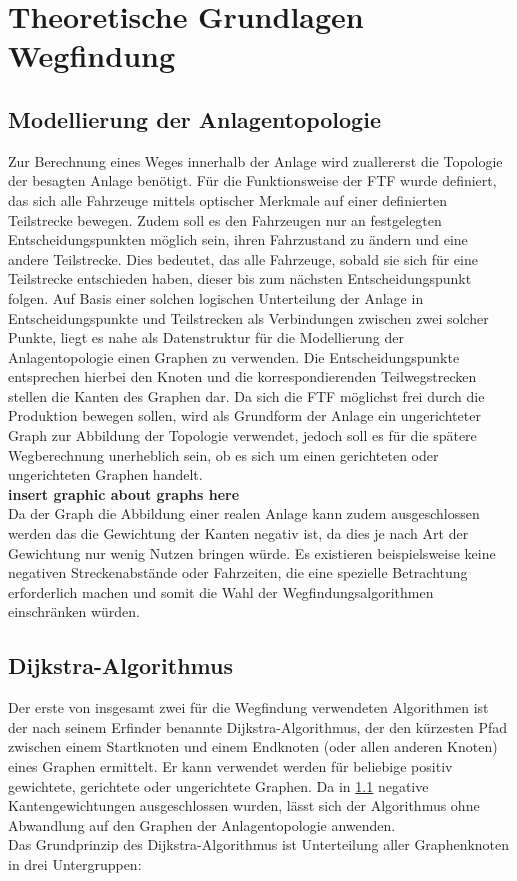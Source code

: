 \chapter{Theoretische Grundlagen Wegfindung}

\section{Modellierung der Anlagentopologie}
	\label{Graph_Anlage}
	Zur Berechnung eines Weges innerhalb der Anlage wird zuallererst die Topologie der besagten Anlage benötigt. Für die Funktionsweise der \ac{FTF} wurde definiert, das sich alle Fahrzeuge mittels optischer Merkmale auf einer definierten Teilstrecke bewegen. Zudem soll es den Fahrzeugen nur an festgelegten Entscheidungspunkten möglich sein, ihren Fahrzustand zu ändern und eine andere Teilstrecke. Dies bedeutet, das alle Fahrzeuge, sobald sie sich für eine Teilstrecke entschieden haben, dieser bis zum nächsten Entscheidungspunkt folgen. Auf Basis einer solchen logischen Unterteilung der Anlage in Entscheidungspunkte und Teilstrecken als Verbindungen zwischen zwei solcher Punkte, liegt es nahe als Datenstruktur für die Modellierung der Anlagentopologie einen Graphen zu verwenden. Die Entscheidungspunkte entsprechen hierbei den Knoten und die korrespondierenden Teilwegstrecken stellen die Kanten des Graphen dar. Da sich die \ac{FTF} möglichst frei durch die Produktion bewegen sollen, wird als Grundform der Anlage ein ungerichteter Graph zur Abbildung der Topologie verwendet, jedoch soll es für die spätere Wegberechnung unerheblich sein, ob es sich um einen gerichteten oder ungerichteten Graphen handelt.\\
	\textbf{insert graphic about graphs here}\\
	Da der Graph die Abbildung einer realen Anlage kann zudem ausgeschlossen werden das die Gewichtung der Kanten negativ ist, da dies je nach Art der Gewichtung nur wenig Nutzen bringen würde. Es existieren beispielsweise keine negativen Streckenabstände oder Fahrzeiten, die eine spezielle Betrachtung erforderlich machen und somit die Wahl der Wegfindungsalgorithmen einschränken würden.
\section{Dijkstra-Algorithmus}
	\label{Dijkstra_Alg}
	Der erste von insgesamt zwei für die Wegfindung verwendeten Algorithmen ist der nach seinem Erfinder benannte Dijkstra-Algorithmus, der den kürzesten Pfad zwischen einem Startknoten und einem Endknoten (oder allen anderen Knoten) eines Graphen ermittelt. Er kann verwendet werden für beliebige positiv gewichtete, gerichtete oder ungerichtete Graphen. Da in \ref{Graph_Anlage} negative Kantengewichtungen ausgeschlossen wurden, lässt sich der Algorithmus ohne Abwandlung auf den Graphen der Anlagentopologie anwenden. \\
	Das Grundprinzip des Dijkstra-Algorithmus ist Unterteilung aller Graphenknoten in drei Untergruppen\cite{DijkstraAlg}:
	
